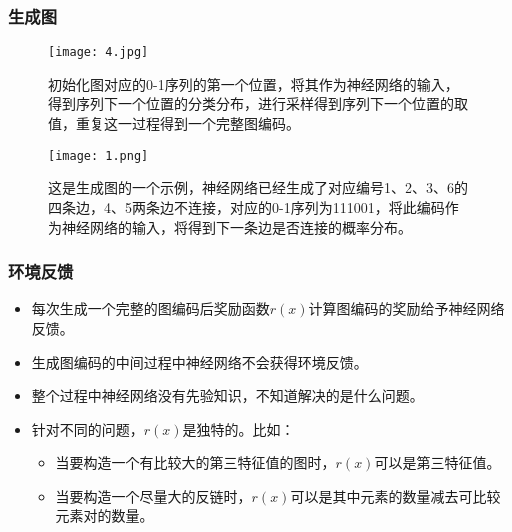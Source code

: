 \documentclass[CJK,aspectratio=169]{beamer}  %
\begin{document}
	\begin{frame}
		\frametitle{生成图}
		\begin{figure}
			\begin{minipage}[t]{0.48\textwidth}
				\centering
				\texttt{[image: 4.jpg]}
				\captionsetup{font=tiny}
				\caption{初始化图对应的0-1序列的第一个位置，将其作为神经网络的输入，得到序列下一个位置的分类分布，进行采样得到序列下一个位置的取值，重复这一过程得到一个完整图编码。}
			\end{minipage}
			\begin{minipage}[t]{0.48\textwidth}
				\centering
				\vspace{-4cm} 
				\setlength{\abovedisplayskip}{0pt}
				
				\setlength{\belowdisplayskip}{50pt}
				\texttt{[image: 1.png]}
				\captionsetup{font=tiny}
				\captionsetup{position=bottom, skip=50pt}
				\caption{这是生成图的一个示例，神经网络已经生成了对应编号1、2、3、6的四条边，4、5两条边不连接，对应的0-1序列为111001，将此编码作为神经网络的输入，将得到下一条边是否连接的概率分布。}
			\end{minipage}
		\end{figure}
	\end{frame}
	\begin{frame}
		\frametitle{环境反馈}
		\begin{itemize}
			\item 每次生成一个完整的图编码后奖励函数$r(x)$计算图编码的奖励给予神经网络反馈。
			\item 生成图编码的中间过程中神经网络不会获得环境反馈。
			\item 整个过程中神经网络没有先验知识，不知道解决的是什么问题。
			\item 针对不同的问题，$r(x)$是独特的。比如：
			\begin{itemize}
				\item 当要构造一个有比较大的第三特征值的图时，$r(x)$可以是第三特征值。
				\item 当要构造一个尽量大的反链时，$r(x)$可以是其中元素的数量减去可比较元素对的数量。
			\end{itemize}
		\end{itemize}
	\end{frame}
	
\end{document}
